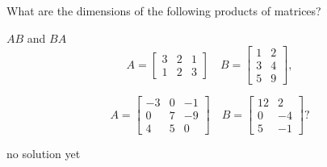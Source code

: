 {
What are the dimensions of the following products of matrices?

$AB$ and $BA$ 
\[ A = 
\begin{bmatrix}
	3 & 2 & 1\\
	1 & 2 & 3
\end{bmatrix}
\quad 
B = 
\begin{bmatrix}
 1 & 2\\
 3 & 4\\
 5 & 9
\end{bmatrix},
\]

\[A = 
\begin{bmatrix}
	-3 & 0 & -1\\
	0 & 7 & -9\\
	4 & 5 & 0
\end{bmatrix}
\quad 
B = 
\begin{bmatrix}
 12 & 2\\
 0 & -4\\
 5 & -1
\end{bmatrix}?
\]


}
{
no solution yet
}
